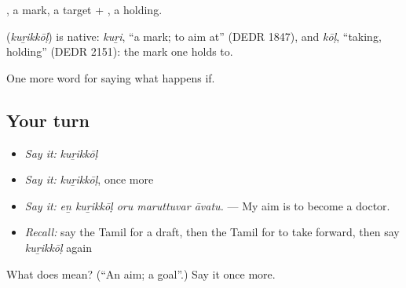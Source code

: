 , a mark, a target + , a holding.

\begin{cousinweb}
\textbf{} (\emph{kuṟikkōḷ}) is native: \emph{kuṟi}, \textquotedblleft{}a mark; to aim at\textquotedblright{} (DEDR 1847), and \emph{kōḷ}, \textquotedblleft{}taking, holding\textquotedblright{} (DEDR 2151): the mark one holds to.
\end{cousinweb}

\begin{grammarlens}[title={What you've built}]
One more word for saying what happens if.
\end{grammarlens}

\subsection*{Your turn}
\begin{itemize}
\raggedright
  \item \emph{Say it:} \emph{kuṟikkōḷ}
  \item \emph{Say it:} \emph{kuṟikkōḷ}, once more
  \item \emph{Say it:} \emph{eṉ kuṟikkōḷ oru maruttuvar āvatu.} — My aim is to become a doctor.
  \item \emph{Recall:} say the Tamil for a draft, then the Tamil for to take forward, then say \emph{kuṟikkōḷ} again
\end{itemize}

\begin{tcolorbox}[breakable,colback=teal!4,colframe=teal!35!black,title={Before you move on}]
What does  mean? (\textquotedblleft{}An aim; a goal\textquotedblright{}.) Say it once more.
\end{tcolorbox}
